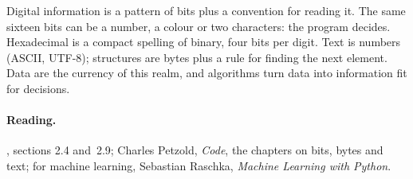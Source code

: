Digital information is a pattern of bits plus a convention for reading it.
The same sixteen bits can be a number, a colour or two characters: the program
decides. Hexadecimal is a compact spelling of binary, four bits per digit.
Text is numbers (ASCII, UTF-8); structures are bytes plus a rule for finding
the next element. Data are the currency of this realm, and algorithms turn
data into information fit for decisions.

\paragraph{Reading.} \citet{patterson2020}, sections 2.4 and~2.9; Charles
Petzold, \emph{Code}, the chapters on bits, bytes and text; for machine
learning, Sebastian Raschka, \emph{Machine Learning with Python}.
